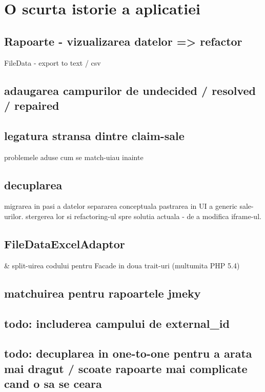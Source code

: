 \section{O scurta istorie a aplicatiei}
	\subsection{Rapoarte - vizualizarea datelor => refactor}
		FileData - export to text / csv
	\subsection{adaugarea campurilor de undecided / resolved / repaired}
	\subsection{legatura stransa dintre claim-sale}
		problemele aduse
		cum se match-uiau inainte
	\subsection{decuplarea}
		migrarea in pasi a datelor
		separarea conceptuala
		pastrarea in UI a generic sale-urilor.
		stergerea lor si refactoring-ul spre solutia actuala - de a modifica iframe-ul.
	\subsection{FileDataExcelAdaptor}
		\& split-uirea codului pentru Facade in doua trait-uri (multumita PHP 5.4)
	\subsection{matchuirea pentru rapoartele jmeky}
	\subsection{todo: includerea campului de external\_id}
	\subsection{todo: decuplarea in one-to-one pentru a arata mai dragut / scoate rapoarte mai complicate cand o sa se ceara}